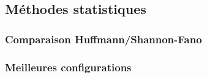 \subsection{Méthodes statistiques}

    \subsubsection{Comparaison Huffmann/Shannon-Fano}

    \subsubsection{Meilleures configurations}